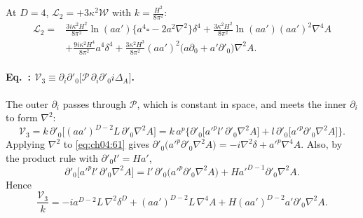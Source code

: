 At $D=4$, $\mathcal L_2=+3\kappa^2\mathcal W$ with $k=\frac{H^2}{8\pi^2}$:
\begin{equation*}
\begin{aligned}
\mathcal L_2={}&\frac{3i\kappa^2H^2}{8\pi^2}\ln(aa')\{a^4\square-2a^2\nabla^2\}\delta^4+\frac{3\kappa^2H^2}{8\pi^2}\ln(aa')(aa')^2\nabla^4A\\
&+\frac{9i\kappa^2H^4}{8\pi^2}a^4\delta^4+\frac{3\kappa^2H^3}{8\pi^2}(aa')^2\big(a\partial_0+a'\partial'_0\big)\nabla^2A .
\end{aligned}
\tag{I.64$'$}\label{eq:ch04:64}
\end{equation*}

\paragraph{Eq.~: $\mathcal V_3\equiv\partial_i\partial'_0\big[\mathcal P\,\partial_i\partial'_0 i\Delta_A\big]$.}
The outer $\partial_i$ passes through $\mathcal P$, which is constant in space, and meets the inner $\partial_i$ to form $\nabla^2$:
\begin{equation}
\mathcal V_3=k\,\partial'_0\big[(aa')^{D-2}L\,\partial'_0\nabla^2A\big]
=k\,a^p\Big\{\partial'_0\big[a'^pl'\,\partial'_0\nabla^2A\big]+l\,\partial'_0\big[a'^p\partial'_0\nabla^2A\big]\Big\}.
\end{equation}
Applying $\nabla^2$ to \eqref{eq:ch04:61} gives $\partial'_0\big(a'^p\partial'_0\nabla^2A\big)=-i\nabla^2\delta+a'^p\nabla^4A$.
Also, by the product rule with $\partial'_0l'=Ha'$,
\begin{equation}
\partial'_0\big[a'^pl'\,\partial'_0\nabla^2A\big]=l'\,\partial'_0\big(a'^p\partial'_0\nabla^2A\big)+Ha'^{D-1}\partial'_0\nabla^2A .
\end{equation}
Hence
\begin{equation}
\frac{\mathcal V_3}{k}=-ia^{D-2}L\,\nabla^2\delta^D+(aa')^{D-2}L\,\nabla^4A+H(aa')^{D-2}a'\partial'_0\nabla^2A .
\label{eq:ch04:V3}
\end{equation}

